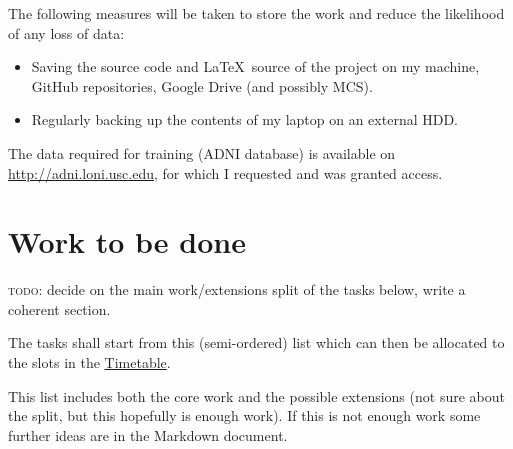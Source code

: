 \documentclass[12pt,a4paper,twoside]{article}
\begin{document}
The following measures will be taken to store the work and reduce the likelihood of any loss of data: 
\begin{itemize}
  \item Saving the source code and \LaTeX\ source of the project on my machine, GitHub repositories, Google Drive (and possibly MCS).
  \item Regularly backing up the contents of my laptop on an external HDD.
\end{itemize}

The data required for training (ADNI database) is available on \url{http://adni.loni.usc.edu}, for which I requested and was granted access.

\section*{Work to be done}
\label{section:work}

\textsc{todo}: decide on the main work/extensions split of the tasks below, write a coherent section.

The tasks shall start from this (semi-ordered) list which can then be allocated to the slots in the \hyperref[section:timetable]{Timetable}. 

This list includes both the core work and the possible extensions (not sure about the split, but this hopefully is enough work). If this is not enough work some further ideas are in the Markdown document.
\end{document}
